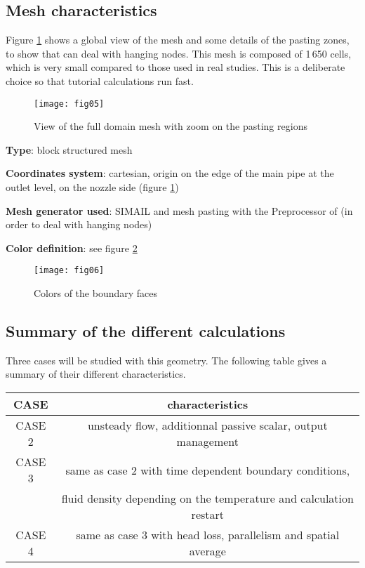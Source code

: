         \subsection{Mesh characteristics}

Figure \ref{figante22} shows a global view of the mesh and some details of
the pasting zones, to show that \CS can deal with hanging nodes.
This mesh is composed of 1\,650 cells, which is very small compared to those used in real
studies. This is a deliberate choice so that tutorial calculations run fast.

\begin{figure}[h!]
\begin{center}
\texttt{[image: fig05]}
\caption{View of the full domain mesh with zoom on the pasting regions}
\label{figante22}
\end{center}
\end{figure}

{\bfseries Type}: block structured mesh

{\bfseries Coordinates system}: cartesian, origin on the edge of the main
pipe at the outlet level, on the nozzle side (figure \ref{figante22})

{\bfseries Mesh generator used}: SIMAIL and mesh pasting with the Preprocessor
of \CS (in order to deal with hanging nodes)

{\bfseries Color definition}: see figure \ref{figante23}

\begin{figure}[h!]
\begin{center}
\texttt{[image: fig06]}
\caption{Colors of the boundary faces}
\label{figante23}
\end{center}
\end{figure}


        \subsection{Summary of the different calculations}

Three cases will be studied with this geometry. The following table gives a
summary of their different characteristics.
\begin{center}
\begin{tabular}{|c|c|}
\hline
CASE & characteristics \\
\hline
CASE 2 & unsteady flow, additionnal passive scalar, output management \\
\hline
CASE 3 & same as case 2 with time dependent boundary conditions, \\
 &       fluid density depending on the temperature and calculation restart\\
\hline
CASE 4 & same as case 3 with head loss, parallelism and spatial average \\
\hline
\end{tabular}
\end{center}


